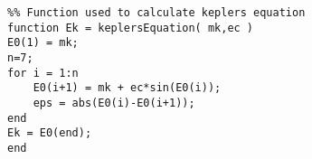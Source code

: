 \begin{verbatim}
%% Function used to calculate keplers equation
function Ek = keplersEquation( mk,ec )
E0(1) = mk;
n=7;
for i = 1:n
    E0(i+1) = mk + ec*sin(E0(i));
    eps = abs(E0(i)-E0(i+1));
end
Ek = E0(end);
end
\end{verbatim}
